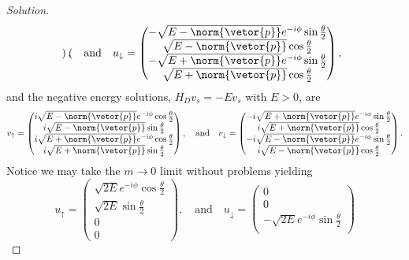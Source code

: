 \begin{proof}[Solution]
\begin{equation*}
\begin{pmatrix}
      \end{pmatrix},
      \quad\text{and}\quad
      u_\downarrow =  \begin{pmatrix}
         -\sqrt{E - \norm{\vetor{p}}} e^{-i\phi} \sin\frac\theta2\\
         \sqrt{E - \norm{\vetor{p}}} \cos\frac\theta2\\
         -\sqrt{E + \norm{\vetor{p}}}e^{-i\phi} \sin\frac\theta2\\
         \sqrt{E + \norm{\vetor{p}}}\cos\frac\theta2
      \end{pmatrix},
   \end{equation*}
   and the negative energy solutions, \(H_D v_s = - E v_s\) with \(E > 0\), are
   \begin{equation*}
      v_\uparrow = \begin{pmatrix}
         i\sqrt{E - \norm{\vetor{p}}} e^{-i\phi} \cos\frac\theta2\\
         i\sqrt{E - \norm{\vetor{p}}} \sin\frac\theta2\\
         i\sqrt{E + \norm{\vetor{p}}}e^{-i\phi} \cos\frac\theta2\\
         i\sqrt{E + \norm{\vetor{p}}}\sin\frac\theta2
      \end{pmatrix},
      \quad\text{and}\quad
      v_\downarrow =  \begin{pmatrix}
         -i\sqrt{E + \norm{\vetor{p}}} e^{-i\phi} \sin\frac\theta2\\
         i\sqrt{E + \norm{\vetor{p}}} \cos\frac\theta2\\
         -i\sqrt{E - \norm{\vetor{p}}}e^{-i\phi} \sin\frac\theta2\\
         i\sqrt{E - \norm{\vetor{p}}}\cos\frac\theta2
      \end{pmatrix}.
   \end{equation*}
   Notice we may take the \(m \to 0\) limit without problems yielding
   \begin{equation*}
      u_\uparrow = \begin{pmatrix}
         \sqrt{2E} e^{-i\phi} \cos\frac\theta2\\
         \sqrt{2E} \sin\frac\theta2\\
         0\\
         0
      \end{pmatrix},
      \quad\text{and}\quad
      u_\downarrow =  \begin{pmatrix}
         0\\
         0\\
         -\sqrt{2E}e^{-i\phi} \sin\frac\theta2\\

\end{pmatrix}
\end{equation*}
\end{proof}
